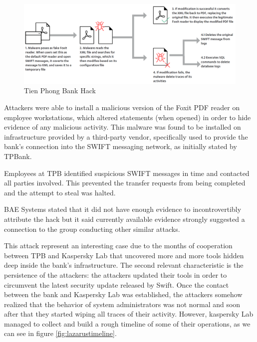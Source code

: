 \documentclass[12pt]{article}
\begin{document}
        \begin{figure}[H]
        \centering
        \includegraphics[width=\textwidth]{figures/vietnam.png}
        \caption{Tien Phong Bank Hack}
        \label{fig:VietnamHacks}
        \end{figure}

        Attackers were able to install a malicious version of the Foxit PDF reader on employee workstations, which altered statements (when opened) in order to hide evidence of any malicious activity. This malware was found to be installed on infrastructure provided by a third-party vendor, specifically used to provide the bank’s connection into the SWIFT messaging network, as initially stated by TPBank.
        
        Employees at TPB identified suspicious SWIFT messages in time and contacted all parties involved. This prevented the transfer requests from being completed and the attempt to steal was halted.
        
        BAE Systems stated that it did not have enough evidence to incontrovertibly attribute the hack but it said currently available evidence strongly suggested a connection to the group conducting other similar attacks.\cite{VietnameseBankBlocks}
        
        This attack represent an interesting case due to the months of cooperation between TPB and Kaspersky Lab that uncovered more and more tools hidden deep inside the bank's infrastructure. The second relevant characteristic is the persistence of the attackers: the attackers updated their tools in order to circumvent the latest security update released by Swift. Once the contact between the bank and Kaspersky Lab was established, the attackers somehow realized that the behavior of system administrators was not normal and soon after that they started wiping all traces of their activity. However, kaspersky Lab managed to collect and build a rough timeline of some of their operations, as we can see in figure \ref{fig:lazarustimeline}. 
        
\end{document}

